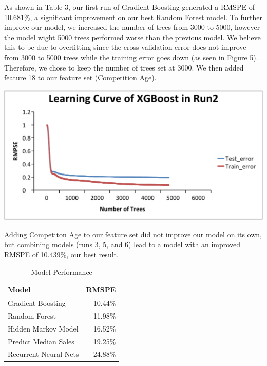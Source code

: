 \documentclass[twoside]{article}
\newenvironment{Figure}
{\par\medskip\noindent\minipage{\linewidth}}
{\endminipage\par\medskip}
\begin{document}
\begin{multicols}{2}
\indent As shown in Table 3, our first run of Gradient Boosting generated a RMSPE of 10.681\%, a significant improvement on our best Random Forest model. To further improve our model, we increased the number of trees from 3000 to 5000, however the model wight 5000 trees performed worse than the previous model. We believe this to be due to overfitting since the cross-validation error does not improve from 3000 to 5000 trees while the training error goes down (as seen in Figure 5). Therefore, we chose to keep the number of trees set at 3000. We then added feature 18 to our feature set (Competition Age).

\begin{Figure}
    \centering
    \includegraphics[width=\linewidth]{images/LearningCurve.png}
    \label{fig:LearningCurve}
\end{Figure}

Adding Competiton Age to our feature set did not improve our model on its own, but combining models (runs 3, 5, and 6) lead to a model with an improved RMSPE of 10.439\%, our best result.

\begin{table}[H]
\caption{Model Performance}
\centering
\begin{tabular}{lr}
\toprule
\cmidrule(r){1-2}
Model & RMSPE \\
\midrule
Gradient Boosting & 10.44\% \\
Random Forest &  11.98\% \\
Hidden Markov Model &  16.52\% \\
Predict Median Sales & 19.25\% \\
Recurrent Neural Nets &  24.88\% \\
\bottomrule
\end{tabular}
\end{table}


\end{multicols}
\end{document}
